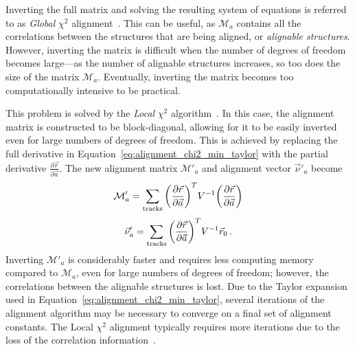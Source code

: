 Inverting the full matrix and solving the resulting system of equations is referred to as \emph{Global} $\chi^2$ alignment~\cite{2005.global-chi2-alignment}.
This can be useful, as $\mathcal{M}_a$ contains all the correlations between the structures that are being aligned, or \emph{alignable structures}.
However, inverting the matrix is difficult when the number of degrees of freedom becomes large---as the number of alignable structures increases, so too does the size of the matrix $\mathcal{M}_a$.
Eventually, inverting the matrix becomes too computationally intensive to be practical.

This problem is solved by the \emph{Local} $\chi^2$ algorithm~\cite{2005.local-chi2-thesis}.
In this case, the alignment matrix is constructed to be block-diagonal, allowing for it to be easily inverted even for large numbers of degrees of freedom.
This is achieved by replacing the full derivative in Equation~\ref{eq:alignment_chi2_min_taylor} with the partial derivative $\frac{\partial\vec{r}}{\partial\vec{a}}$.
The new alignment matrix $\mathcal{M}'_{a}$ and alignment vector $\vec{\nu}'_a$ become
\begin{equation}
  \mathcal{M}'_a = \sum\limits_{\textrm{tracks}}\bigg(\pderiv{\vec{r}}{\vec{a}}\bigg)^{T}V^{-1}\bigg(\pderiv{\vec{r}}{\vec{a}}\bigg)
  \label{eq:alignment_matrix_local}
\end{equation}
\begin{equation}
  \vec{\nu}'_a = \sum\limits_{\textrm{tracks}}\bigg(\pderiv{\vec{r}}{\vec{a}}\bigg)^{T}V^{-1}\vec{r}_0\,.
  \label{eq:alignment_vector_local}
\end{equation}
Inverting $\mathcal{M}'_{a}$ is considerably faster and requires less computing memory compared to $\mathcal{M}_{a}$, even for large numbers of degrees of freedom; however, the correlations between the alignable structures is lost.
Due to the Taylor expansion used in Equation~\ref{eq:alignment_chi2_min_taylor}, several iterations of the alignment algorithm may be necessary to converge on a final set of alignment constants.
The Local $\chi^2$ alignment typically requires more iterations due to the loss of the correlation information~\cite{2007.alignment-strategy}.

